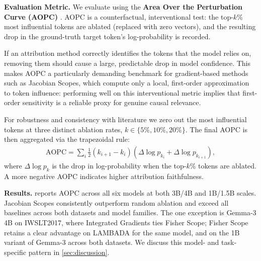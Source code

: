 \documentclass{article}
\begin{document}
\noindent\textbf{Evaluation Metric.}
We evaluate using the \textbf{Area Over the Perturbation Curve (AOPC)} \cite{samek2016evaluating}.
AOPC is a counterfactual, interventional test: the top-$k$\% most influential tokens are ablated (replaced with zero vectors), and the resulting drop in the ground-truth target token's log-probability is recorded.

If an attribution method correctly identifies the tokens that the model relies on, removing them should cause a large, predictable drop in model confidence.
This makes AOPC a particularly demanding benchmark for gradient-based methods such as Jacobian Scopes, which compute only a local, first-order approximation to token influence: performing well on this interventional metric implies that first-order sensitivity is a reliable proxy for genuine causal relevance.

For robustness and consistency with literature \cite{samek2016evaluating, deyoung-etal-2020-eraser} we zero out the most influential tokens at three distinct ablation rates, $k \in \{5\%, 10\%, 20\%\}$. The final AOPC is then aggregated via the trapezoidal rule:
\begin{align}
    \mathrm{AOPC} = \sum_{i} \tfrac{1}{2}(k_{i+1} - k_i)
    \left(\Delta\log p_{k_i} + \Delta\log p_{k_{i+1}}\right),
\end{align}
where $\Delta \log p_k$ is the drop in log-probability when the top-$k$\% tokens are ablated.
A more negative AOPC indicates higher attribution faithfulness.

\noindent\textbf{Results.}
 reports AOPC across all six models at both 3B/4B and 1B/1.5B scales.
Jacobian Scopes consistently outperform random ablation and exceed all baselines across both datasets and model families.
The one exception is Gemma-3 4B on IWSLT2017, where Integrated Gradients ties Fisher Scope; Fisher Scope retains a clear advantage on LAMBADA for the same model, and on the 1B variant of Gemma-3 across both datasets. We discuss this model- and task-specific pattern in \cref{sec:discussion}.
\end{document}
